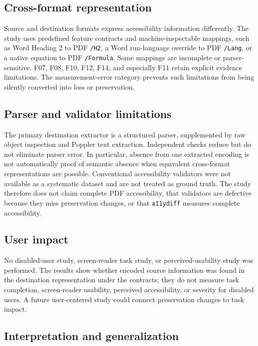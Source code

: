 \subsection{Cross-format representation}

Source and destination formats express accessibility information differently. The study uses predefined feature contracts and machine-inspectable mappings, such as Word Heading 2 to PDF \texttt{/H2}, a Word run-language override to PDF \texttt{/Lang}, or a native equation to PDF \texttt{/Formula}. Some mappings are incomplete or parser-sensitive. F07, F08, F10, F12, F14, and especially F11 retain explicit evidence limitations. The measurement-error category prevents such limitations from being silently converted into loss or preservation.

\subsection{Parser and validator limitations}

The primary destination extractor is a structured parser, supplemented by raw object inspection and Poppler text extraction. Independent checks reduce but do not eliminate parser error. In particular, absence from one extracted encoding is not automatically proof of semantic absence when equivalent cross-format representations are possible. Conventional accessibility validators were not available as a systematic dataset and are not treated as ground truth. The study therefore does not claim complete PDF accessibility, that validators are defective because they miss preservation changes, or that \texttt{a11ydiff} measures complete accessibility.

\subsection{User impact}

No disabled-user study, screen-reader task study, or perceived-usability study was performed. The results show whether encoded source information was found in the destination representation under the contracts; they do not measure task completion, screen-reader usability, perceived accessibility, or severity for disabled users. A future user-centered study could connect preservation changes to task impact.

\subsection{Interpretation and generalization}

